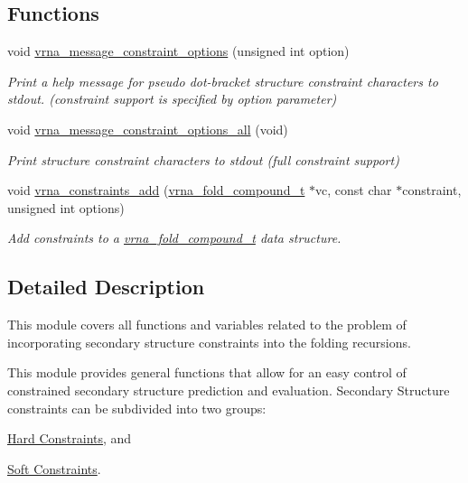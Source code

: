 \subsection*{Functions}
\begin{DoxyCompactItemize}
\item 
void \hyperlink{group__constraints_gaa1f20b53bf09ac2e6b0dbb13f7d89670}{vrna\+\_\+message\+\_\+constraint\+\_\+options} (unsigned int option)
\begin{DoxyCompactList}\small\item\em Print a help message for pseudo dot-\/bracket structure constraint characters to stdout. (constraint support is specified by option parameter) \end{DoxyCompactList}\item 
void \hyperlink{group__constraints_gaec7e13fa0465c2acc7a621d1aecb709f}{vrna\+\_\+message\+\_\+constraint\+\_\+options\+\_\+all} (void)
\begin{DoxyCompactList}\small\item\em Print structure constraint characters to stdout (full constraint support) \end{DoxyCompactList}\item 
void \hyperlink{group__constraints_ga35a401f680969a556858a8dd5f1d07cc}{vrna\+\_\+constraints\+\_\+add} (\hyperlink{group__fold__compound_ga1b0cef17fd40466cef5968eaeeff6166}{vrna\+\_\+fold\+\_\+compound\+\_\+t} $\ast$vc, const char $\ast$constraint, unsigned int options)
\begin{DoxyCompactList}\small\item\em Add constraints to a \hyperlink{group__fold__compound_ga1b0cef17fd40466cef5968eaeeff6166}{vrna\+\_\+fold\+\_\+compound\+\_\+t} data structure. \end{DoxyCompactList}\end{DoxyCompactItemize}


\subsection{Detailed Description}
This module covers all functions and variables related to the problem of incorporating secondary structure constraints into the folding recursions. 

This module provides general functions that allow for an easy control of constrained secondary structure prediction and evaluation. Secondary Structure constraints can be subdivided into two groups\+:


\begin{DoxyItemize}
\item \hyperlink{group__hard__constraints}{Hard Constraints}, and
\item \hyperlink{group__soft__constraints}{Soft Constraints}.
\end{DoxyItemize}

